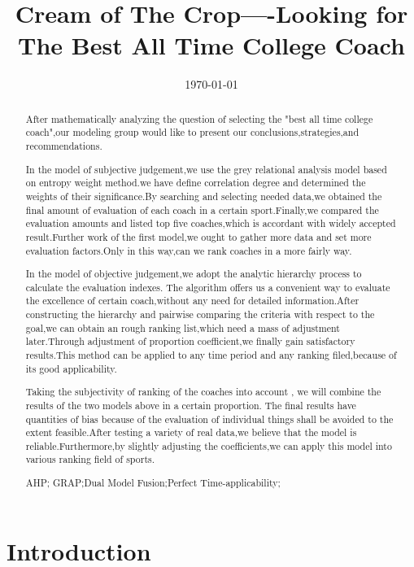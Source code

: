 \documentclass{mcmthesis}
\title{Cream of The Crop----Looking for The Best All Time College Coach}  %
\date{\today}
\begin{document}
\begin{abstract}
\par After mathematically analyzing the question of selecting the  "best all time college coach",our modeling group would like to present our conclusions,strategies,and recommendations.

\par In the model of subjective judgement,we use the grey relational analysis model based on entropy weight method.we have define correlation degree  and determined the weights of their significance.By searching and selecting needed data,we obtained the final amount of evaluation of each coach in a certain sport.Finally,we compared the evaluation amounts and listed top five coaches,which is accordant with widely accepted result.Further work of the first  model,we ought to gather more data and set more evaluation factors.Only in this way,can we rank coaches in a more fairly way.
\par In the model of objective judgement,we adopt  the analytic hierarchy process to calculate the evaluation indexes. The algorithm offers us a convenient way to evaluate the excellence of certain coach,without any need for detailed information.After constructing the hierarchy and pairwise comparing the criteria with respect to the goal,we can obtain an rough ranking list,which need a mass of adjustment later.Through adjustment of proportion coefficient,we finally gain satisfactory results.This method can be applied to any time period and any ranking filed,because of its good applicability.
\par Taking the subjectivity of ranking of the coaches into account , we will combine the results of the two models above in a certain proportion. The final results have quantities of  bias because of  the evaluation of individual things shall be avoided to the extent feasible.After testing a variety of real  data,we believe that the model is reliable.Furthermore,by slightly adjusting the coefficients,we can apply this model into various ranking field of sports.
\begin{keywords}
AHP; GRAP;Dual Model Fusion;Perfect Time-applicability;
\end{keywords}
\end{abstract}
\maketitle


\tableofcontents%

\section{Introduction}   
\end{document}
